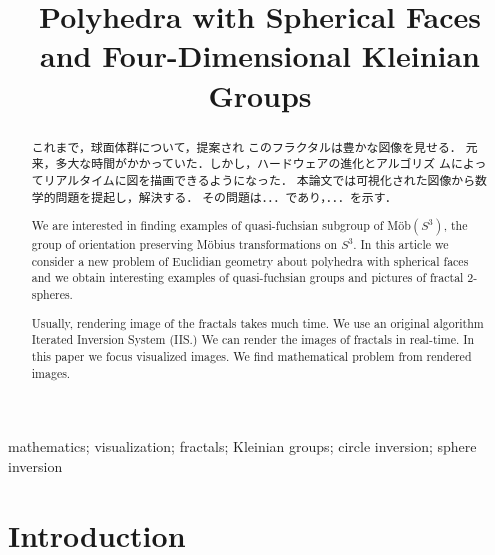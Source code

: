 \documentclass[dvipdfmx]{interact}
\theoremstyle{plain}%
\theoremstyle{definition}
\theoremstyle{remark}
\theoremstyle{problemstyle}
\begin{document}

\title{Polyhedra with Spherical Faces and Four-Dimensional Kleinian Groups}

\author{
}

\maketitle

\begin{abstract}
 これまで，球面体群について，提案され
 このフラクタルは豊かな図像を見せる．
 元来，多大な時間がかかっていた．しかし，ハードウェアの進化とアルゴリズ
 ムによってリアルタイムに図を描画できるようになった．
 本論文では可視化された図像から数学的問題を提起し，解決する．
 その問題は．．．であり，．．．を示す．

 We are interested in finding examples of quasi-fuchsian subgroup of
 M\"ob$(S^3)$, the group of orientation preserving M\"obius
 transformations on $S^3$. In this article we consider a new problem of
 Euclidian geometry about polyhedra with spherical faces and we obtain
 interesting examples of quasi-fuchsian groups and pictures of fractal
 2-spheres.

 Usually, rendering image of the fractals takes much time.
 We use an original algorithm Iterated Inversion System (IIS.)
 We can render the images of fractals in real-time.
 In this paper we focus visualized images.
 We find mathematical problem from rendered images.
\end{abstract}

\begin{keywords}
mathematics; visualization; fractals; Kleinian groups; circle inversion;
 sphere inversion
\end{keywords}

\section{Introduction}
\end{document}
